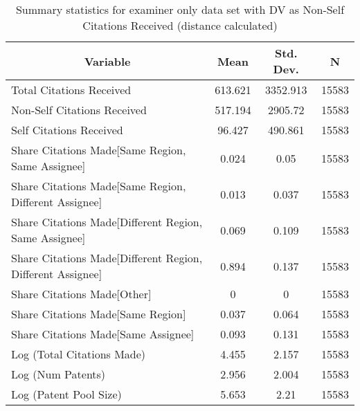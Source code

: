 
\begin{table}[htbp]\centering \caption{Summary statistics for examiner only data set with DV as Non-Self Citations Received (distance calculated) \label{e.nsummary}}
\begin{tabular}{l c c  c}\hline\hline
\multicolumn{1}{c}{\textbf{Variable}} & \textbf{Mean}
 & \textbf{Std. Dev.} & \textbf{N}\\ \hline
Total Citations Received & 613.621 & 3352.913  & 15583\\
Non-Self Citations Received & 517.194 & 2905.72  & 15583\\
Self Citations Received & 96.427 & 490.861  & 15583\\
Share Citations Made[Same Region, Same Assignee] & 0.024 & 0.05  & 15583\\
Share Citations Made[Same Region, Different Assignee] & 0.013 & 0.037  & 15583\\
Share Citations Made[Different Region, Same Assignee] & 0.069 & 0.109  & 15583\\
Share Citations Made[Different Region, Different Assignee] & 0.894 & 0.137  & 15583\\
Share Citations Made[Other] & 0 & 0  & 15583\\
Share Citations Made[Same Region] & 0.037 & 0.064  & 15583\\
Share Citations Made[Same Assignee] & 0.093 & 0.131  & 15583\\
Log (Total Citations Made) & 4.455 & 2.157  & 15583\\
Log (Num Patents) & 2.956 & 2.004  & 15583\\
Log (Patent Pool Size) & 5.653 & 2.21  & 15583\\
\hline\end{tabular}
\end{table}
